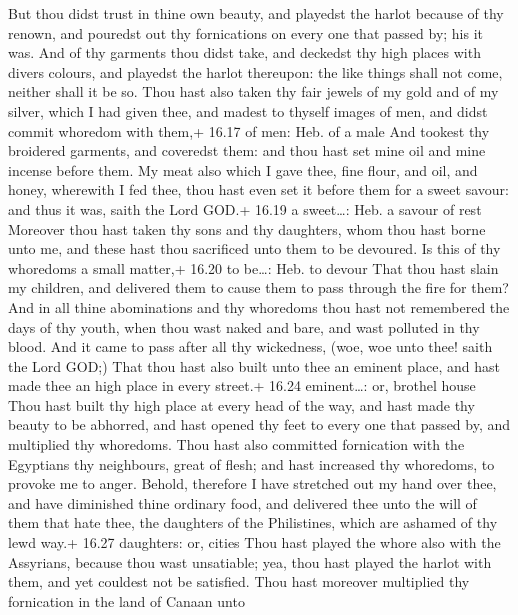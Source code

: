  But thou didst trust in thine own beauty, and playedst
the harlot because of thy renown, and pouredst out thy fornications on
every one that passed by; his it was.  And of thy garments
thou didst take, and deckedst thy high places with divers colours, and
playedst the harlot thereupon: the like things shall not come, neither
shall it be so.  Thou hast also taken thy fair jewels of my
gold and of my silver, which I had given thee, and madest to thyself
images of men, and didst commit whoredom with them,+ 16.17 of men: Heb.
of a male  And tookest thy broidered garments, and
coveredst them: and thou hast set mine oil and mine incense before them.
 My meat also which I gave thee, fine flour, and oil, and
honey, wherewith I fed thee, thou hast even set it before them for a
sweet savour: and thus it was, saith the Lord GOD.+ 16.19 a sweet\ldots:
Heb. a savour of rest  Moreover thou hast taken thy sons
and thy daughters, whom thou hast borne unto me, and these hast thou
sacrificed unto them to be devoured. Is this of thy whoredoms a small
matter,+ 16.20 to be\ldots: Heb. to devour  That thou hast
slain my children, and delivered them to cause them to pass through the
fire for them?  And in all thine abominations and thy
whoredoms thou hast not remembered the days of thy youth, when thou wast
naked and bare, and wast polluted in thy blood.  And it
came to pass after all thy wickedness, (woe, woe unto thee! saith the
Lord GOD;)  That thou hast also built unto thee an eminent
place, and hast made thee an high place in every street.+ 16.24
eminent\ldots: or, brothel house  Thou hast built thy high
place at every head of the way, and hast made thy beauty to be abhorred,
and hast opened thy feet to every one that passed by, and multiplied thy
whoredoms.  Thou hast also committed fornication with the
Egyptians thy neighbours, great of flesh; and hast increased thy
whoredoms, to provoke me to anger.  Behold, therefore I
have stretched out my hand over thee, and have diminished thine ordinary
food, and delivered thee unto the will of them that hate thee, the
daughters of the Philistines, which are ashamed of thy lewd way.+ 16.27
daughters: or, cities  Thou hast played the whore also with
the Assyrians, because thou wast unsatiable; yea, thou hast played the
harlot with them, and yet couldest not be satisfied.  Thou
hast moreover multiplied thy fornication in the land of Canaan unto

